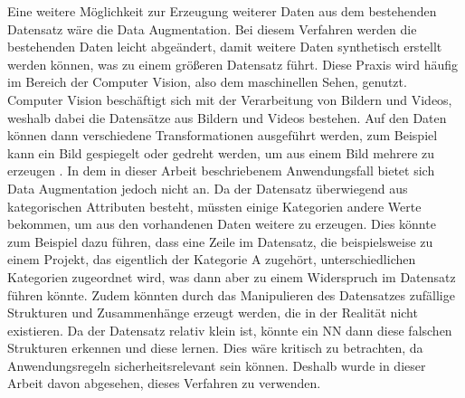 Eine weitere Möglichkeit zur Erzeugung weiterer Daten aus dem bestehenden Datensatz wäre die Data Augmentation. Bei diesem Verfahren werden die bestehenden Daten 
leicht abgeändert, damit weitere Daten synthetisch erstellt werden können, was zu einem größeren Datensatz führt. Diese Praxis wird häufig im Bereich der Computer Vision,
also dem \glqq maschinellen Sehen\grqq{}, genutzt. Computer Vision beschäftigt sich mit der Verarbeitung von Bildern und Videos, weshalb dabei die Datensätze 
aus Bildern und Videos bestehen. Auf den Daten können dann verschiedene Transformationen ausgeführt werden, zum Beispiel kann ein Bild gespiegelt oder gedreht werden, um aus 
einem Bild mehrere zu erzeugen \cite[vgl. S.184f.]{DL_PY}. In dem in dieser Arbeit beschriebenem Anwendungsfall bietet sich Data Augmentation jedoch nicht an. Da der Datensatz überwiegend
aus kategorischen Attributen besteht, müssten einige Kategorien andere Werte bekommen, um aus den vorhandenen Daten weitere zu erzeugen. Dies könnte zum Beispiel dazu führen,
dass eine Zeile im Datensatz, die beispielsweise zu einem Projekt, das eigentlich der Kategorie \glqq A\grqq{} zugehört, unterschiedlichen Kategorien zugeordnet wird, 
was dann aber zu einem Widerspruch im Datensatz führen könnte. Zudem könnten durch das Manipulieren des Datensatzes zufällige Strukturen und Zusammenhänge erzeugt werden,
die in der Realität nicht existieren. Da der Datensatz relativ klein ist, könnte ein \ac{NN} dann diese falschen Strukturen erkennen und diese lernen. Dies wäre kritisch zu betrachten,
da Anwendungsregeln sicherheitsrelevant sein können. Deshalb wurde in dieser Arbeit davon abgesehen, dieses Verfahren zu verwenden.

